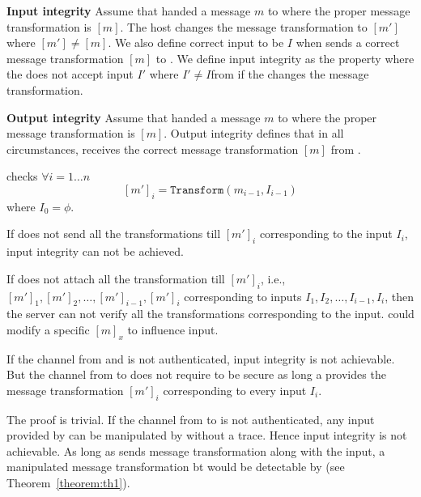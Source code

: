 \begin{definition}{\textbf{Input integrity}}
\label{def:inputIntegrity}
Assume that \server handed a message $m$ to \host where the proper message transformation is $[m]$. The host changes the message transformation to $[m']$ where $[m']\neq [m]$. We also define correct \user input to be $I$ when \host sends a correct message transformation $[m]$ to \user. We define input integrity as the property where the \server does not accept input $I'$ where $I'\neq I$from \user if the \host changes the message transformation.
\end{definition}

\begin{definition}{\textbf{Output integrity}}
\label{def:outputIntegrity}
Assume that \server handed a message $m$ to \host where the proper message transformation is $[m]$. Output integrity defines that in all circumstances, \user receives the correct message transformation $[m]$ from \host.
\end{definition}

 \server checks $\forall i=1\ldots n$ $$[m']_i = \texttt{Transform}(m_{i-1}, I_{i-1})$$ where $I_0=\phi$.

\begin{theorem}
\label{theorem:th1}
If \user does not send all the transformations till $[m']_i$ corresponding to the input $I_i$, input integrity can not be achieved. 
\end{theorem}

\begin{IEEEproof}
If \user does not attach all the transformation till $[m']_i$, i.e., $[m']_1, [m']_2, \ldots, [m']_{i-1}, [m']_i$  corresponding to inputs $I_1, I_2,\ldots, I_{i-1}, I_i$, then the server can not verify all the transformations corresponding to the input. \host could modify a specific $[m]_x$ to influence \user input.
\end{IEEEproof}

\begin{theorem}
\label{theorem:th2}
If the channel from \user and \server is not authenticated, input integrity is not achievable. But the channel from \server to \user does not require to be secure as long a \user provides the message transformation $[m']_i$ corresponding to every input $I_i$.
\end{theorem}

\begin{IEEEproof}
The proof is trivial. If the channel from \user to \server is not authenticated, any input provided by \user can be manipulated by \host without a trace. Hence input integrity is not achievable. As long as \user sends message transformation along with the input, a manipulated message transformation bt \host would be detectable by \server (see Theorem~\ref{theorem:th1}).
\end{IEEEproof}

